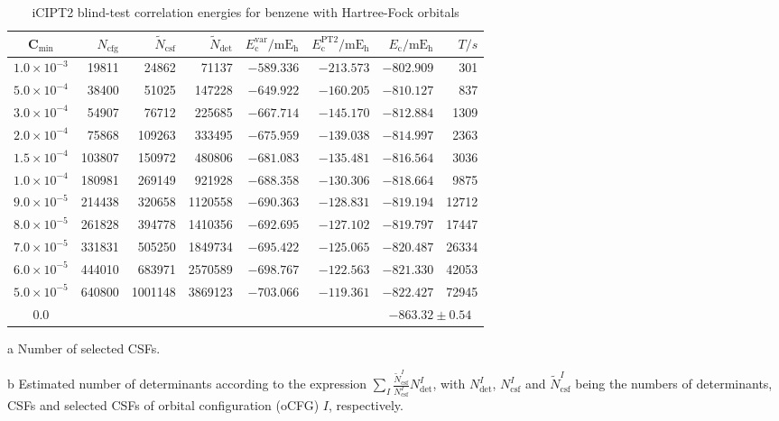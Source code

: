 \documentclass[journal=jcp,manuscript=suppinfo]{achemso}
\begin{document}
\begin{table}[!htp]
	\small
	\caption{iCIPT2 blind-test correlation energies for benzene with Hartree-Fock orbitals }
	\begin{threeparttable}
		\centering
	\begin{tabular}{c|rrrrrrr}\toprule
		C$_{\text{min}}$&$N_{\mathrm{cfg}}$&$\tilde{N}_{\mathrm{csf}}$\tnote{a}&$\tilde{N}_{\mathrm{det}}$\tnote{b}
		&$E_{\mathrm{c}}^{\mathrm{var}}/\mathrm{mE_h}$&$E_{\mathrm{c}}^{\mathrm{PT2}}/\mathrm{mE_h}$&$E_{\mathrm{c}}/\mathrm{mE_h}$&$T/s$\tnote{c}\\\toprule
			$1.0\times10^{-3}$ &    19811 &    24862 &  71137&  $-589.336$  &  $-213.573$&  $-802.909$ &301  \\
			$5.0\times10^{-4}$ &    38400 &    51025 & 147228&  $-649.922$  &  $-160.205$&  $-810.127$ &837  \\
			$3.0\times10^{-4}$ &    54907 &    76712 & 225685&  $-667.714$  &  $-145.170$&  $-812.884$ &1309 \\
			$2.0\times10^{-4}$ &    75868 &   109263 & 333495&  $-675.959$  &  $-139.038$&  $-814.997$ &2363 \\
			$1.5\times10^{-4}$ &   103807 &   150972 & 480806&  $-681.083$  &  $-135.481$&  $-816.564$ &3036 \\
			$1.0\times10^{-4}$ &   180981 &   269149 & 921928&  $-688.358$  &  $-130.306$&  $-818.664$ &9875 \\
			$9.0\times10^{-5}$ &   214438 &   320658 &1120558&  $-690.363$  &  $-128.831$&  $-819.194$ &12712\\
			$8.0\times10^{-5}$ &   261828 &   394778 &1410356&  $-692.695$  &  $-127.102$&  $-819.797$ &17447\\
			$7.0\times10^{-5}$ &   331831 &   505250 &1849734&  $-695.422$  &  $-125.065$&  $-820.487$ &26334\\
			$6.0\times10^{-5}$ &   444010 &   683971 &2570589&  $-698.767$  &  $-122.563$&  $-821.330$ &42053\\
			$5.0\times10^{-5}$ &   640800 &  1001148 &3869123&  $-703.066$  &  $-119.361$&  $-822.427$ &72945\\\midrule
			0.0\tnote{b}&&&&&&\multicolumn{2}{c}{$-863.32\pm0.54$}\\\bottomrule
		\end{tabular}
\begin{tablenotes}
\item[a]Number of selected CSFs.
\item[b]Estimated number of determinants according to the expression $\sum_I\frac{\tilde{N}_{\mathrm{csf}}^I}{N_{\mathrm{csf}}^I}N_{\mathrm{det}}^I$, with $N_{\mathrm{det}}^I$, $N_{\mathrm{csf}}^I$ and $\tilde{N}_{\mathrm{csf}}^I$ being the numbers of determinants, CSFs and selected CSFs of orbital configuration (oCFG) $I$, respectively.

\end{tablenotes}
\end{threeparttable}
\end{table}
\end{document}
